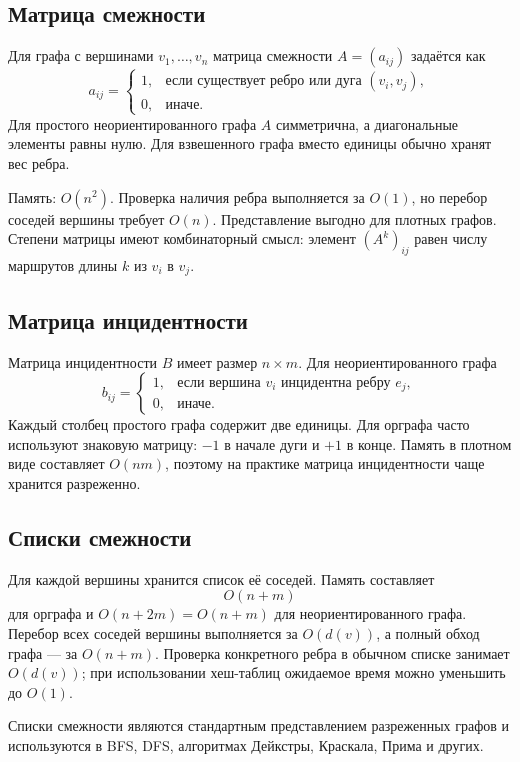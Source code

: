 \subsection{Матрица смежности}

Для графа с вершинами $v_1,\ldots,v_n$ матрица смежности $A=(a_{ij})$ задаётся
как
\[
 a_{ij}=\begin{cases}
 1, & \text{если существует ребро или дуга }(v_i,v_j),\\
 0, & \text{иначе}.
 \end{cases}
\]
Для простого неориентированного графа $A$ симметрична, а диагональные элементы
равны нулю. Для взвешенного графа вместо единицы обычно хранят вес ребра.

Память: $O(n^2)$. Проверка наличия ребра выполняется за $O(1)$, но перебор
соседей вершины требует $O(n)$. Представление выгодно для плотных графов.
Степени матрицы имеют комбинаторный смысл: элемент $(A^k)_{ij}$ равен числу
маршрутов длины $k$ из $v_i$ в $v_j$.

\subsection{Матрица инцидентности}

Матрица инцидентности $B$ имеет размер $n\times m$. Для неориентированного графа
\[
 b_{ij}=\begin{cases}
 1, & \text{если вершина }v_i\text{ инцидентна ребру }e_j,\\
 0, & \text{иначе}.
 \end{cases}
\]
Каждый столбец простого графа содержит две единицы. Для орграфа часто используют
знаковую матрицу: $-1$ в начале дуги и $+1$ в конце. Память в плотном виде
составляет $O(nm)$, поэтому на практике матрица инцидентности чаще хранится
разреженно.

\subsection{Списки смежности}

Для каждой вершины хранится список её соседей. Память составляет
\[
    O(n+m)
\]
для орграфа и $O(n+2m)=O(n+m)$ для неориентированного графа.
Перебор всех соседей вершины выполняется за $O(d(v))$, а полный обход графа ---
за $O(n+m)$. Проверка конкретного ребра в обычном списке занимает $O(d(v))$;
при использовании хеш-таблиц ожидаемое время можно уменьшить до $O(1)$.

Списки смежности являются стандартным представлением разреженных графов и
используются в BFS, DFS, алгоритмах Дейкстры, Краскала, Прима и других.


